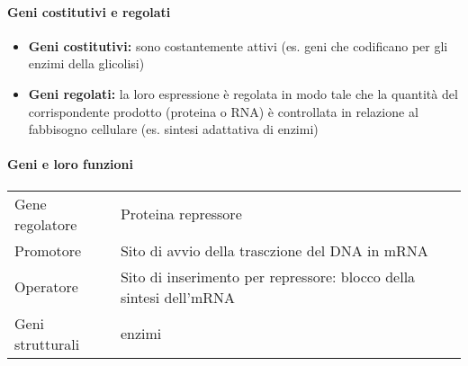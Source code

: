 \documentclass{article}
\begin{document}
\paragraph{Geni costitutivi e regolati}
\begin{itemize}
    \item \textbf{Geni costitutivi:} sono costantemente attivi (es. geni che codificano per gli enzimi della glicolisi)
    \item \textbf{Geni regolati:} la loro espressione è regolata in modo tale che la quantità del corrispondente prodotto (proteina o RNA) è controllata in relazione al fabbisogno cellulare (es. sintesi adattativa di enzimi)
\end{itemize}
\paragraph{Geni e loro funzioni}
\begin{center}
    \begin{tabular}{ll}
        \toprule
        Gene regolatore & Proteina repressore\\
        Promotore & Sito di avvio della trasczione del DNA in mRNA\\
        Operatore & Sito di inserimento per repressore: blocco della sintesi dell'mRNA\\
        Geni strutturali & enzimi\\
        \bottomrule
    \end{tabular}
\end{center}
\end{document}
